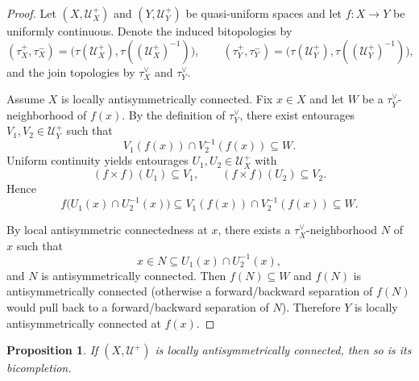 \documentclass[preprint,12pt]{elsarticle}
\newtheorem{proposition}[theorem]{Proposition}
\begin{document}
\begin{proof}
Let $(X,\mathcal U_X^{+})$ and $(Y,\mathcal U_Y^{+})$ be quasi-uniform
spaces and let $f:X\to Y$ be uniformly continuous.
Denote the induced bitopologies by
\[
(\tau_X^{+},\tau_X^{-})=\bigl(\tau(\mathcal U_X^{+}),\tau((\mathcal U_X^{+})^{-1})\bigr),
\qquad
(\tau_Y^{+},\tau_Y^{-})=\bigl(\tau(\mathcal U_Y^{+}),\tau((\mathcal U_Y^{+})^{-1})\bigr),
\]
and the join topologies by $\tau_X^\vee$ and $\tau_Y^\vee$.

Assume $X$ is locally antisymmetrically connected.
Fix $x\in X$ and let $W$ be a $\tau_Y^\vee$-neighborhood of $f(x)$.
By the definition of $\tau_Y^\vee$, there exist entourages
$V_1,V_2\in\mathcal U_Y^{+}$ such that
\[
V_1(f(x))\cap V_2^{-1}(f(x))\subseteq W.
\]
Uniform continuity yields entourages $U_1,U_2\in\mathcal U_X^{+}$ with
\[
(f\times f)(U_1)\subseteq V_1,
\qquad
(f\times f)(U_2)\subseteq V_2.
\]
Hence
\[
f\bigl(U_1(x)\cap U_2^{-1}(x)\bigr)\subseteq V_1(f(x))\cap V_2^{-1}(f(x))\subseteq W.
\]

By local antisymmetric connectedness at $x$, there exists a $\tau_X^\vee$-neighborhood
$N$ of $x$ such that
\[
x\in N\subseteq U_1(x)\cap U_2^{-1}(x),
\]
and $N$ is antisymmetrically connected.
Then $f(N)\subseteq W$ and $f(N)$ is antisymmetrically connected (otherwise
a forward/backward separation of $f(N)$ would pull back to a forward/backward
separation of $N$). Therefore $Y$ is locally antisymmetrically connected at $f(x)$.
\end{proof}

\begin{proposition}
\label{prop:bicompletion-invariance}
If $(X,\mathcal U^{+})$ is locally antisymmetrically connected, then so
is its bicompletion.
\end{proposition}
\end{document}
